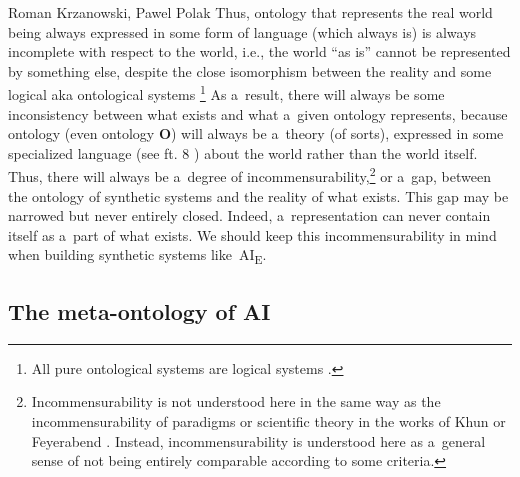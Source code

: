 \begin{artengenv2auth}{Roman Krzanowski, Pawel Polak}
Thus, ontology that represents the real world being always expressed in some form of language (which always is) is always incomplete with respect to the world, i.e., the world ``as is'' cannot be represented by something else, despite the close isomorphism between the reality and some logical aka ontological systems \footnote{All pure ontological systems are logical systems
\parencites[][p.xiii]{jacquette_ontology_2002}[see e.g.,][]{foschini_where_2013}.%
} As a~result, there will always be some inconsistency between what exists and what a~given ontology represents, because ontology (even ontology \textbf{O}) will always be a~theory (of sorts), expressed in some specialized language (see ft. 8 ) about the world rather than the world itself. Thus, there will always be a~degree of incommensurability,\footnote{Incommensurability is not understood here in the same way as the incommensurability of paradigms or scientific theory in the works of Khun 
\parencite*[][]{kuhn_structure_1962} %
 or Feyerabend 
\parencites[e.g.,][]{ryan_feyerabend_2002}[for the incommensurability of paradigms, see also][]{sankey_kuhns_1993}[][]{oberheim_incommensurability_2018}[][]{bird_thomas_2000}. %
 Instead, incommensurability is understood here as a~general sense of not being entirely comparable according to some criteria.} or a~gap, between the ontology of synthetic systems and the reality of what exists. This gap may be narrowed but never entirely closed. Indeed, a~representation can never contain itself as a~part of what exists. We should keep this incommensurability in mind when building synthetic systems like~AI\textsubscript{E}.

\subsection*{The meta-ontology of AI}


\end{artengenv2auth}
